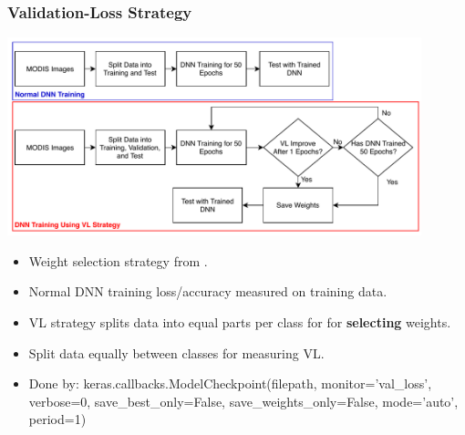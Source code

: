 \documentclass{beamer}
\begin{document}
\begin{frame}
  \frametitle{Validation-Loss Strategy}
  \tiny

\centering
\includegraphics[width=0.9\textwidth]{figs/icdm_dnn}


 \hspace{-1cm}
 \scriptsize
 \begin{itemize}
  \item Weight selection strategy from \cite{Sze-To2017}.
\item Normal DNN training loss/accuracy measured on training data. 
\item VL strategy splits data into equal parts per class for for \textbf{selecting} weights.
\item Split data equally between classes for measuring VL.
\item Done by: keras.callbacks.ModelCheckpoint(filepath, monitor='val\_loss', 
verbose=0, save\_best\_only=False, save\_weights\_only=False, mode='auto', 
period=1)
 \end{itemize}



\end{frame}
\end{document}
